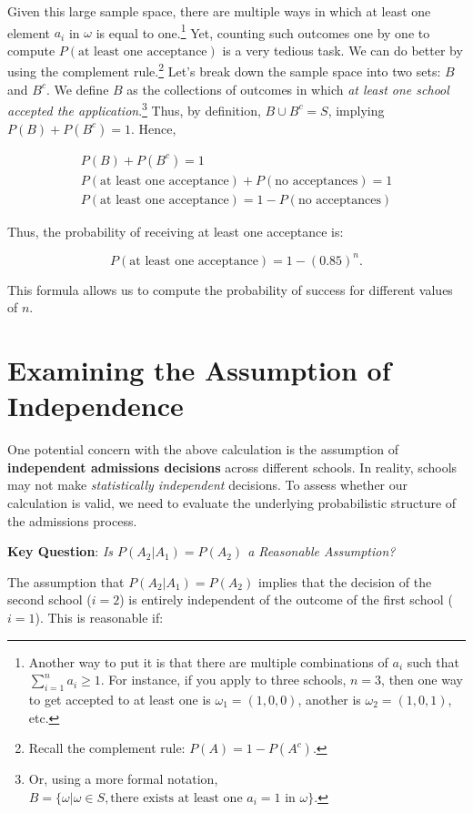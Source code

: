 \documentclass{article}
\begin{document}
Given this large sample space, there are multiple ways in which at least one element $a_i$ in $\omega$ is equal to one.\footnote{Another way to put it is that there are multiple combinations of $a_i$ such that $\sum_{i=1}^{n}a_i \geq 1$. For instance, if you apply to three schools, $n=3$, then one way to get accepted to at least one is $\omega_1=(1,0,0)$, another is $\omega_2=(1,0,1)$, etc.} Yet, counting such outcomes one by one to compute $P(\text{at least one acceptance})$ is a very tedious task. We can do better by using the complement rule.\footnote{Recall the complement rule: $P(A) = 1 - P(A^c)$.} Let's break down the sample space into two sets: $B$ and $B^c$. We define $B$ as the collections of outcomes in which \emph{at least one school accepted the application}.\footnote{Or, using a more formal notation, $B = \{\omega |\omega \in S, \text{there exists at least one $a_i=1$ in $\omega$} \} $.} Thus, by definition, $B \cup B^c = S$, implying $P(B) + P(B^c) = 1$. Hence,

\begin{align*}
P(B) + P(B^c) = 1 \\
P(\text{at least one acceptance}) + P(\text{no acceptances}) = 1 \\
\boxed{
    P(\text{at least one acceptance}) = 1 - P(\text{no acceptances})
}
\end{align*}


Thus, the probability of receiving at least one acceptance is:

\[
P(\text{at least one acceptance}) = 1 - (0.85)^n.
\]

This formula allows us to compute the probability of success for different values of \( n \). 

\section{Examining the Assumption of Independence}

One potential concern with the above calculation is the assumption of \textbf{independent admissions decisions} across different schools. In reality, schools may not make \emph{statistically independent} decisions. To assess whether our calculation is valid, we need to evaluate the underlying probabilistic structure of the admissions process.

 \textbf{Key Question}: \emph{Is \( P(A_2 | A_1) = P(A_2)  \) a Reasonable Assumption?}

The assumption that \( P(A_2 | A_1) = P(A_2) \) implies that the decision of the second school ($i=2$) is entirely independent of the outcome of the first school ($i=1$). This is reasonable if:
\end{document}
